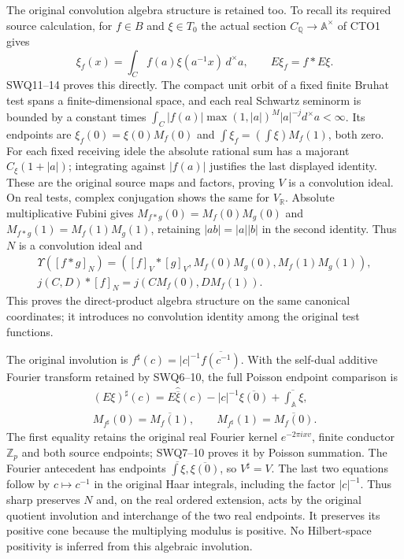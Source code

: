 The original convolution algebra structure is retained too. To recall
its required source calculation, for $f\in B$ and $\xi\in T_0$ the
actual section $C_{\mathbb Q}\to\mathbb A^\times$ of CTO1 gives
\[
\xi_f(x)=\int_C f(a)\xi(a^{-1}x)\,d^\times a,\qquad
E\xi_f=f*E\xi.
\]
SWQ11--14 proves this directly. The compact unit orbit of a fixed
finite Bruhat test spans a finite-dimensional space, and each real
Schwartz seminorm is bounded by a constant times
$\int_C|f(a)|\max(1,|a|)^M|a|^{-j}d^\times a<\infty$.
Its endpoints are
$\xi_f(0)=\xi(0)M_f(0)$ and
$\int\xi_f=(\int\xi)M_f(1)$, both zero. For each fixed receiving
idele the absolute rational sum has a majorant
$C_\xi(1+|a|)$; integrating against $|f(a)|$ justifies the
last displayed identity. These are the original source maps
and factors, proving $V$ is a convolution ideal. On real tests,
complex conjugation shows the same for $V_{\mathbb R}$.
Absolute multiplicative Fubini gives
$M_{f*g}(0)=M_f(0)M_g(0)$ and
$M_{f*g}(1)=M_f(1)M_g(1)$, retaining $|ab|=|a||b|$ in the
second identity. Thus $N$ is a convolution ideal and
\begin{equation}\tag{CTO22b}
\begin{gathered}
\Upsilon([f*g]_N)
 =([f]_V*[g]_V,M_f(0)M_g(0),M_f(1)M_g(1)),\\
j(C,D)*[f]_N=j(CM_f(0),DM_f(1)).
\end{gathered}
\end{equation}
This proves the direct-product algebra structure on the same
canonical coordinates; it introduces no convolution identity
among the original test functions.

The original involution is
$f^\sharp(c)=|c|^{-1}\overline{f(c^{-1})}$.
With the self-dual additive Fourier transform retained by SWQ6--10,
the full Poisson endpoint comparison is
\begin{equation}\tag{CTO22c}
\begin{gathered}
(E\xi)^\sharp(c)
 =E\widehat{\overline\xi}(c)
     -|c|^{-1}\overline{\xi(0)}
     +\overline{\int_{\mathbb A}\xi},\\
M_{f^\sharp}(0)=\overline{M_f(1)},\qquad
M_{f^\sharp}(1)=\overline{M_f(0)}.
\end{gathered}
\end{equation}
The first equality retains the original real Fourier kernel
$e^{-2\pi ixv}$, finite conductor $\mathbb Z_p$ and both
source endpoints; SWQ7--10 proves it by Poisson summation.
The Fourier antecedent has endpoints
$\overline{\int\xi},\overline{\xi(0)}$, so $V^\sharp=V$.
The last two equations follow by $c\mapsto c^{-1}$ in the
original Haar integrals, including the factor $|c|^{-1}$.
Thus sharp preserves $N$ and, on the real ordered extension,
acts by the original quotient involution and interchange of
the two real endpoints. It preserves its positive cone because
the multiplying modulus is positive. No Hilbert-space positivity
is inferred from this algebraic involution.

